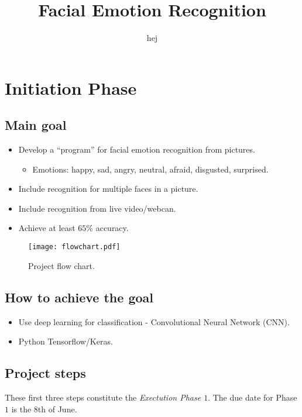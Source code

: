 \documentclass[]{article}
\begin{document}
\author{hej}
\title{Facial Emotion Recognition}
\maketitle{}

\section{Initiation Phase}
\subsection{Main goal}
\begin{itemize}
\item Develop a ``program'' for facial emotion recognition from pictures.
    \begin{itemize}
    \item Emotions: happy, sad, angry, neutral, afraid, disgusted, surprised. 
    \end{itemize}
\item Include recognition for multiple faces in a picture.
\item Include recognition from live video/webcan.
\item Achieve at least $65$\% accuracy.
\end{itemize}

\begin{figure}
    \texttt{[image: flowchart.pdf]}
    \caption{Project flow chart.}
\end{figure}

\subsection{How to achieve the goal}
\begin{itemize}
\item Use deep learning for classification - Convolutional Neural Network (CNN).
\item Python Tensorflow/Keras.
\end{itemize}

\subsection{Project steps}

These first three steps constitute the \textit{Exectution Phase $1$}. The due date for Phase $1$ is the 8th of June.
\end{document}
